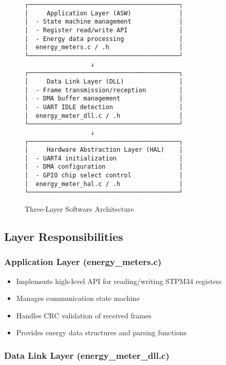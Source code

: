 \documentclass[11pt,a4paper]{article}
\begin{document}
\begin{figure}[H]
\centering
\begin{verbatim}
┌─────────────────────────────────────────┐
│     Application Layer (ASW)             │
│  - State machine management             │
│  - Register read/write API              │
│  - Energy data processing               │
│  energy_meters.c / .h                   │
└─────────────────────────────────────────┘
                  ↓
┌─────────────────────────────────────────┐
│     Data Link Layer (DLL)               │
│  - Frame transmission/reception         │
│  - DMA buffer management                │
│  - UART IDLE detection                  │
│  energy_meter_dll.c / .h                │
└─────────────────────────────────────────┘
                  ↓
┌─────────────────────────────────────────┐
│     Hardware Abstraction Layer (HAL)    │
│  - UART4 initialization                 │
│  - DMA configuration                    │
│  - GPIO chip select control             │
│  energy_meter_hal.c / .h                │
└─────────────────────────────────────────┘
\end{verbatim}
\caption{Three-Layer Software Architecture}
\label{fig:architecture}
\end{figure}

\subsection{Layer Responsibilities}

\subsubsection{Application Layer (energy\_meters.c)}

\begin{itemize}[noitemsep]
    \item Implements high-level API for reading/writing STPM34 registers
    \item Manages communication state machine
    \item Handles CRC validation of received frames
    \item Provides energy data structures and parsing functions
\end{itemize}

\subsubsection{Data Link Layer (energy\_meter\_dll.c)}
\end{document}

